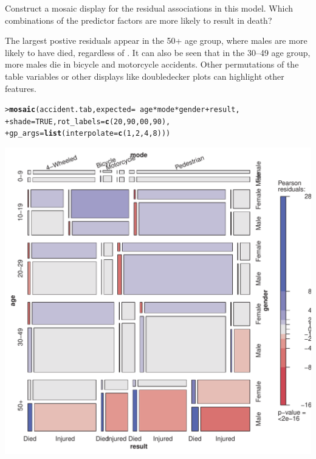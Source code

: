 \documentclass[10pt]{report}\usepackage[]{graphicx}\usepackage[]{color}
\makeatletter
\newcommand{\hlnum}[1]{\textcolor[rgb]{0.686,0.059,0.569}{#1}}%
\newcommand{\hlopt}[1]{\textcolor[rgb]{0,0,0}{#1}}%
\newcommand{\hlstd}[1]{\textcolor[rgb]{0.345,0.345,0.345}{#1}}%
\newcommand{\hlkwc}[1]{\textcolor[rgb]{0.333,0.667,0.333}{#1}}%
\newcommand{\hlkwd}[1]{\textcolor[rgb]{0.737,0.353,0.396}{\textbf{#1}}}%
\newenvironment{kframe}{%
 \def\at@end@of@kframe{}%
 \ifinner\ifhmode%
  \def\at@end@of@kframe{\end{minipage}}%
  \begin{minipage}{\columnwidth}%
 \fi\fi%
 \def\FrameCommand##1{\hskip\@totalleftmargin \hskip-\fboxsep
 \colorbox{shadecolor}{##1}\hskip-\fboxsep
     \hskip-\linewidth \hskip-\@totalleftmargin \hskip\columnwidth}%
 \MakeFramed {\advance\hsize-\width
   \@totalleftmargin\z@ \linewidth\hsize
   \@setminipage}}%
 {\par\unskip\endMakeFramed%
 \at@end@of@kframe}
\newenvironment{knitrout}{}{} %
\renewenvironment{knitrout}{\small\renewcommand{\baselinestretch}{.85}}{} %
\makeatother
\begin{document}
\begin{Exercises}
\begin{enumerate*}
      \item Construct a mosaic display for the residual associations in this model.  Which combinations of the
      predictor factors are more likely to result in death?
      \begin{ans}
      The largest postive residuals appear in the 50+ age group, where males are more likely to have died,
      regardless of .  It can also be seen that in the 30--49 age group, more males die
      in bicycle and motorcycle accidents.  Other permutations of the table variables or
      other displays like doubledecker plots can highlight other features.
\begin{knitrout}\footnotesize
{}\color{fgcolor}\begin{kframe}
\begin{alltt}
\hlstd{> }\hlkwd{mosaic}\hlstd{(accident.tab,} \hlkwc{expected} \hlstd{=} \hlopt{~}\hlstd{age} \hlopt{*} \hlstd{mode} \hlopt{*} \hlstd{gender} \hlopt{+} \hlstd{result,}
\hlstd{+ }       \hlkwc{shade}\hlstd{=}\hlnum{TRUE}\hlstd{,} \hlkwc{rot_labels} \hlstd{=} \hlkwd{c}\hlstd{(}\hlnum{20}\hlstd{,} \hlnum{90}\hlstd{,} \hlnum{00}\hlstd{,} \hlnum{90}\hlstd{),}
\hlstd{+ }       \hlkwc{gp_args}\hlstd{=}\hlkwd{list}\hlstd{(}\hlkwc{interpolate}\hlstd{=}\hlkwd{c}\hlstd{(}\hlnum{1}\hlstd{,}\hlnum{2}\hlstd{,}\hlnum{4}\hlstd{,}\hlnum{8}\hlstd{)))}
\end{alltt}
\end{kframe}

\centerline{\includegraphics[width=.7\textwidth]{soln/fig/ex5_9d-1} }



\end{knitrout}
      \end{ans}
      

\end{enumerate*}
\end{Exercises}
\end{document}
